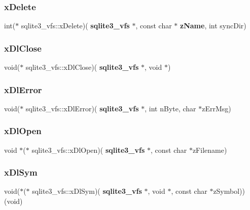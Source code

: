 \mbox{\label{structsqlite3__vfs_a5f547a3e54f91c7ebef140d51054bbc0}} 
\subsubsection{xDelete}
{\footnotesize\ttfamily int($\ast$ sqlite3\+\_\+vfs\+::x\+Delete)(\textbf{ sqlite3\+\_\+vfs} $\ast$, const char $\ast$\textbf{ z\+Name}, int sync\+Dir)}

\mbox{\label{structsqlite3__vfs_adaa986b55a44971e7048d160ac5071ad}} 
\subsubsection{xDlClose}
{\footnotesize\ttfamily void($\ast$ sqlite3\+\_\+vfs\+::x\+Dl\+Close)(\textbf{ sqlite3\+\_\+vfs} $\ast$, void $\ast$)}

\mbox{\label{structsqlite3__vfs_a3cda3a00a43861cef4d5554354cdfda4}} 
\subsubsection{xDlError}
{\footnotesize\ttfamily void($\ast$ sqlite3\+\_\+vfs\+::x\+Dl\+Error)(\textbf{ sqlite3\+\_\+vfs} $\ast$, int n\+Byte, char $\ast$z\+Err\+Msg)}

\mbox{\label{structsqlite3__vfs_ad6587e730f4f8bce2b0129664a9a86b9}} 
\subsubsection{xDlOpen}
{\footnotesize\ttfamily void $\ast$($\ast$ sqlite3\+\_\+vfs\+::x\+Dl\+Open)(\textbf{ sqlite3\+\_\+vfs} $\ast$, const char $\ast$z\+Filename)}

\mbox{\label{structsqlite3__vfs_a20ef3dacb974e3e480782629cbbf7534}} 
\subsubsection{xDlSym}
{\footnotesize\ttfamily void($\ast$($\ast$ sqlite3\+\_\+vfs\+::x\+Dl\+Sym)(\textbf{ sqlite3\+\_\+vfs} $\ast$, void $\ast$, const char $\ast$z\+Symbol))(void)}

